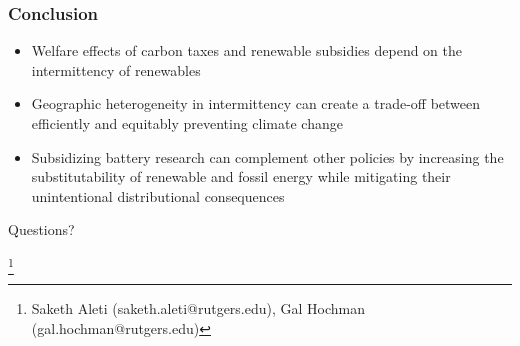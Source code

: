 \documentclass[aspectratio=169]{beamer}
\newcommand\blfootnote[1]{%
	\begingroup
	\renewcommand\thefootnote{}\footnote{#1}%
	\addtocounter{footnote}{-1}%
	\endgroup
}
\begin{document}
\begin{frame}
\frametitle{Conclusion}

\begin{itemize}
	\setlength\itemsep{1em}
	\item Welfare effects of carbon taxes and renewable subsidies depend on the intermittency of renewables
	\item Geographic heterogeneity in intermittency can create a trade-off between efficiently and equitably preventing climate change
	\item Subsidizing battery research can complement other policies by increasing the substitutability of renewable and fossil energy while mitigating their unintentional distributional consequences 
\end{itemize}

\end{frame}

\begin{frame}

\begin{block}{\centering \large Questions?}
\end{block}

\blfootnote{Saketh Aleti (saketh.aleti@rutgers.edu), Gal Hochman (gal.hochman@rutgers.edu)}


\end{frame}
\end{document}
